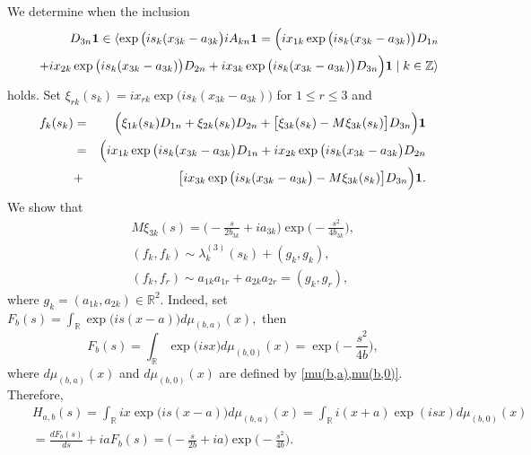 \documentclass[preprint,12pt]{elsarticle}
\numberwithin{equation}{section}
\begin{document}
\begin{pf}
We determine when the inclusion
\begin{eqnarray*}
 &&
 D_{3n}{\bf 1}\in\langle \exp\big(is_k(x_{3k}-a_{3k}\big)iA_{kn}{\bf 1}=\Big(ix_{1k}\exp\big(is_k(x_{3k}-a_{3k})\big)D_{1n}\\
&& +ix_{2k}\exp\big(is_k(x_{3k}-a_{3k})\big)D_{2n}+ix_{3k}\exp\big(is_k(x_{3k}-a_{3k})\big)D_{3n}\Big){\bf 1}\mid k\in {\mathbb Z}\rangle
\end{eqnarray*}
holds. Set $\xi_{rk}(s_k)=ix_{rk}\exp\big(is_k(x_{3k}-a_{3k})\big)$ for $1\leq r \leq 3$ and
%
\begin{eqnarray}
\label{f_k(s)}
f_k(s_k)&=&\Big(\xi_{1k}(s_k)D_{1n}+\xi_{2k}(s_k)D_{2n}+\big[\xi_{3k}(s_k)-M\xi_{3k}(s_k)\big]D_{3n}\Big){\bf 1}\\
\nonumber
&=&\Big(ix_{1k}\exp\big(is_k(x_{3k}-a_{3k}\big)D_{1n}+ix_{2k}\exp\big(is_k(x_{3k}-a_{3k}\big)D_{2n}\\
\nonumber
&+&\big[ix_{3k}\exp\big(is_k(x_{3k}-a_{3k}\big)-M\xi_{3k}(s_k)\big]D_{3n}\Big){\bf 1}.
\end{eqnarray}
We show that 
\begin{eqnarray}
 \label{M(x.exp(x))}
&&M\xi_{3k}(s)=\Big(-\frac{s}{2b_{3k}}+ia_{3k}\Big)\exp\Big(-\frac{s^2}{4b_{3k}}\Big),\\
\label{(f(k),f(k))}
&& (f_k,f_k)\sim \lambda_k^{(3)}(s_k)+(g_k,g_k),\\
\label{(f(k),f(r))}
&& (f_k,f_r)\sim a_{1k}a_{1r}+a_{2k}a_{2r}=(g_k,g_r),
\end{eqnarray}
where $g_k=(a_{1k},a_{2k})\in \mathbb R^2$. Indeed, set
$
F_b(s) =\int_{\mathbb R}\exp\big(is(x-a)\big)d\mu_{(b,a)}(x),
$
then
\begin{equation}
\label{F_b(a)} 
F_b(s)=\int_{\mathbb R}\exp\big(isx\big)d\mu_{(b,0)}(x)=\exp\big(-\frac{s^2}{4b}\Big),
\end{equation}
where $d\mu_{(b,a)}(x)$ and $d\mu_{(b,0)}(x)$ are defined by \eqref{mu(b,a),mu(b,0)}. 
Therefore,
\begin{eqnarray}
&&
H_{a,b}(s)=\int_{\mathbb R}ix\exp\big(is(x-a)\big)d\mu_{(b,a)}(x)=\int_{\mathbb R}i(x+a)\exp(isx)d\mu_{(b,0)}(x)\\
\label{H(a,b,s)}
&&=\frac{dF_b(s)}{ds}+iaF_b(s)=\Big(-\frac{s}{2b}+ia\Big)\exp\Big(-\frac{s^2}{4b}\Big).
\end{eqnarray}


\end{pf}
\end{document}
